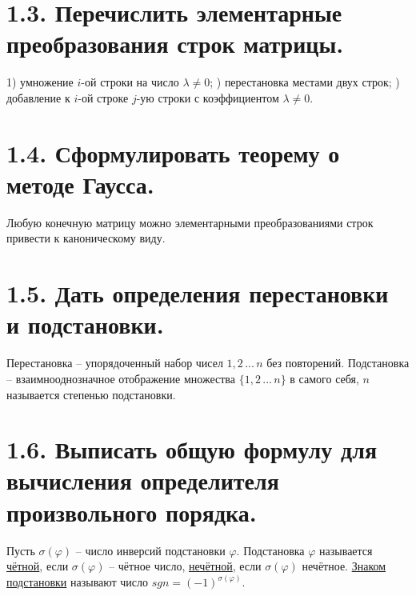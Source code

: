 \documentclass{article}
\begin{document}
\section*{\LARGE 1.3. Перечислить элементарные преобразования строк матрицы. }

1) умножение $i$-ой строки на число $\lambda \ne 0$;
) перестановка местами двух строк;
) добавление к $i$-ой строке $j$-ую строки с коэффициентом $\lambda \ne 0$.

\section*{\LARGE 1.4. Сформулировать теорему о методе Гаусса.  }

Любую конечную матрицу можно элементарными преобразованиями строк привести к каноническому виду.

\section*{\LARGE 1.5. Дать определения перестановки и подстановки.  }

Перестановка -- упорядоченный набор чисел $1, 2 \,...\, n$ без повторений.
\newline Подстановка -- взаимнооднозначное отображение множества $\{1, 2 \,...\, n\}$ в самого себя, $n$ называется степенью подстановки.

\section*{\LARGE 1.6. Выписать общую формулу для вычисления определителя произвольного порядка.  }

Пусть $\sigma(\varphi)$ -- число инверсий подстановки $\varphi$.
\newline Подстановка $\varphi$ называется \underline{чётной}, если $\sigma(\varphi)$ -- чётное число, \underline{нечётной}, если $\sigma(\varphi)$ нечётное. 
\newline \underline{Знаком подстановки} называют число $sgn = (-1)^{\sigma(\varphi)}$.
\end{document}

